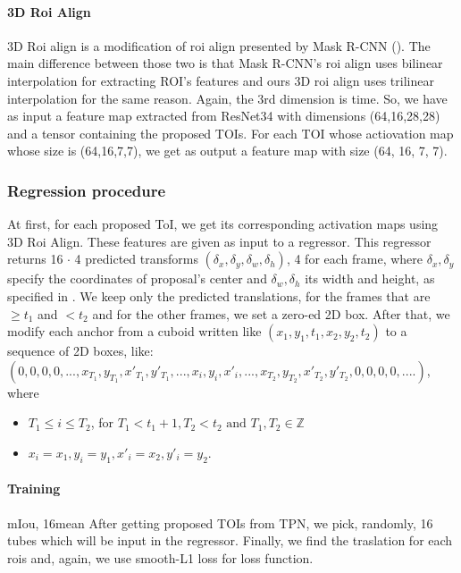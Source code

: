 \documentclass{report}
\begin{document}
\paragraph{3D Roi Align}
3D Roi align is a modification of roi align presented by Mask R-CNN (\cite{DBLP:journals/corr/HeGDG17}). The main difference between those two is that Mask R-CNN's roi align uses
bilinear interpolation for extracting ROI's features and ours 3D roi align uses trilinear interpolation for the same reason. Again, the 3rd dimension is
time.
So, we have as input a feature map extracted from ResNet34 with dimensions (64,16,28,28) and a tensor containing the proposed TOIs.
For each TOI whose actiovation map whose size is (64,16,7,7), we get as output a feature map with size (64, 16, 7, 7). \par
\subsubsection{Regression procedure}
At first, for each proposed ToI, we get its corresponding activation maps using 3D Roi Align. These features are given as input to a regressor. This regressor returns 16 $\cdot$ 4 predicted
transforms $(\delta_x,\delta_y, \delta_w,\delta_h)$, 4 for each frame, where $ \delta_x, \delta_y$ specify the coordinates of proposal's center and $\delta_w, \delta_h$ its width and height, as specified
in \cite{DBLP:journals/corr/GirshickDDM13}.  We keep only the predicted translations, for the frames that are $\ge t_1$ and $< t_2$ and for the other frames, we set a zero-ed 2D box. 
After that, we modify each anchor from a cuboid written like $(x_1,y_1,t_1, x_2, y_2, t_2)$ to a sequence of 2D boxes, like: \\
$(0,0,0,0, ..., x_{T_1},y_{T_1},x'_{T_1},y'_{T_1}, ... ,x_{i},y_{i},x'_{i}, ..., x_{T_2},y_{T_2},x'_{T_2},y'_{T_2}, 0,0,0,0, ....)$, where
\begin{itemize}
\item $ T_1 \le i \le T_2$, for $T_1 < t_1 + 1,  T_2 < t_2 \text{ and }T_1,T_2 \in \mathbb{Z} $
\item $ x_i = x_1, y_i= y_1, x'_i = x_2, y'_i = y_2 $.
\end{itemize}

\paragraph{ Training}
mIou, 16mean
After getting proposed TOIs from TPN, we pick, randomly, 16 tubes which will be input in the regressor.
Finally, we find the traslation for each rois and, again, we use smooth-L1 loss for loss function.\par
\end{document}
